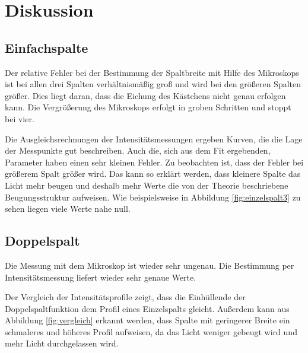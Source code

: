 \section{Diskussion}
\label{sec:Diskussion}

\subsection{Einfachspalte}
Der relative Fehler bei der Bestimmung der Spaltbreite mit Hilfe
des Mikroskops ist bei allen drei Spalten verhältnismäßig groß und
wird bei den größeren Spalten größer. Dies liegt daran, dass die Eichung
des Kästchens nicht genau erfolgen kann. Die Vergrößerung des Mikroskops
erfolgt in groben Schritten und stoppt bei vier.

Die Ausgleichsrechnungen der Intensitätsmessungen ergeben Kurven, die die Lage der Messpunkte gut beschreiben.
Auch die, sich aus dem Fit ergebenden, Parameter haben einen sehr kleinen Fehler.
Zu beobachten ist, dass der Fehler bei größerem Spalt größer wird. Das kann so erklärt
werden, dass kleinere Spalte das Licht mehr beugen und deshalb mehr Werte
die von der Theorie beschriebene Beugungsstruktur aufweisen. Wie beispielsweise in Abbildung
\ref{fig:einzelspalt3} zu sehen liegen viele Werte nahe null.

\subsection{Doppelspalt}

Die Messung mit dem Mikroskop ist wieder sehr ungenau.
Die Bestimmung per Intensitätsmessung liefert wieder sehr genaue
Werte.

Der Vergleich der Intensitätsprofile zeigt, dass die Einhüllende der
Doppelspaltfunktion dem Profil eines Einzelspalts gleicht. Außerdem kann aus
Abbildung \ref{fig:vergleich} erkannt werden, dass Spalte mit geringerer Breite ein schmaleres
und höheres Profil aufweisen, da das Licht weniger gebeugt wird
und mehr Licht durchgelassen wird.
